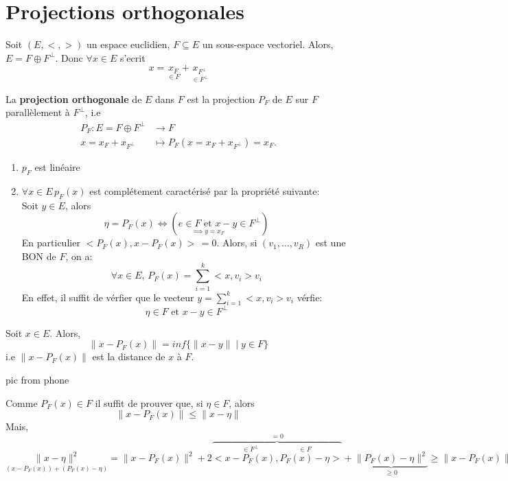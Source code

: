 \section{Projections orthogonales}
Soit $(E, <,>)$ un espace euclidien,  $F \subseteq E$ un sous-espace vectoriel. Alors,  $E = F \oplus F^{\perp}$. Donc $\forall x \in E$ s'ecrit 
\[
x = \underset{\in F}{x_F} + \underset{\in F^{\perp}}{x_{F^{\perp}}}
\] 
\begin{definition}
    La \textbf{projection orthogonale} de $E$ dans  $F$ est la projection  $P_F$ de  $E$ sur  $F$ parallèlement  à $F^{\perp}$, i.e
    \begin{align*}
        P_F: E = F \oplus F^{\perp} &\longrightarrow F \\
        x = x_F + x_{F^{\perp}} &\longmapsto P_F(x = x_F + x_{F^{\perp}}) = x_F
    .\end{align*}
\end{definition}
\begin{remark}
   \begin{enumerate}
       \item $p_F$ est linéaire
       \item  $\forall x \in E \, p_{F}(x)$ est complétement caractérisé par la propriété suivante:\\
           Soit $y \in E$, alors
            \[
                \eta = P_F(x) \iff \left( \underset{\implies y = x_F}{e \in F \text{ et } x - y} \in F^{\perp} \right) 
           \] 
           En particulier $<P_F(x), x - P_F(x)> \,= 0$. Alors, si $(v_1, \ldots, v_R)$ est une BON de $F$, on a:
            \[
           \forall x \in E, \, P_F(x) = \sum_{i=1}^{k} <x, v_i>v_i
           \] 
           En effet, il suffit de vérfier que le vecteur $y = \sum_{i=1}^{k} <x, v_i>v_i$ vérfie:
           \[
               \eta \in F \text{ et } x - y \in F^{\perp}
           \] 
   \end{enumerate} 
\end{remark}
\begin{prop}
   Soit $x \in E$. Alors,
   \[
       \|x - P_F(x)\| = inf\{\|x - y\| \mid y \in F\}
   \] 
   i.e $\|x - P_F(x)\|$ est la distance de  $x$ à  $F$.
    \begin{TODO}
      pic from phone 
   \end{TODO}
\end{prop}
\begin{preuve}
   Comme $P_F(x) \in F$ il suffit de prouver que, si  $\eta \in F$, alors 
   \[
   \|x - P_F(x)\| \le \|x - \eta\|
   \] 
   Mais, $\underset{(x - P_F(x)) + (P_F(x) - \eta)}{\|x - \eta\|^2} = \|x - P_F(x)\|^2 + 2\overbrace{<\overset{\in F^{\perp}}{x - P_F(x)}, \overset{\in F}{P_F(x) - \eta}>}^{= 0} + \underbrace{\|P_F(x) - \eta\|^2}_{\ge 0} \ge \|x - P_F(x)\|^2$
\end{preuve}
